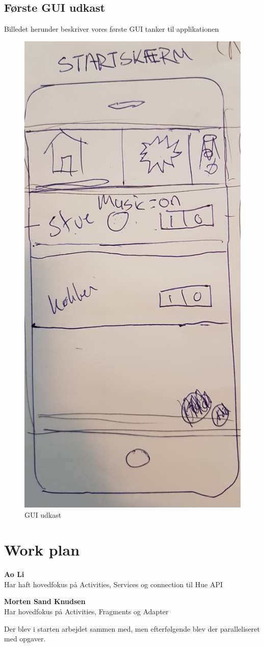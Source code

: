 		\subsection{Første GUI udkast}
		Billedet herunder beskriver vores første GUI tanker til applikationen
		\begin{figure}[H]
			\centering
			\includegraphics[width=0.6\linewidth, height=1\linewidth]{Kravspecifikation/GUI}
			\caption{GUI udkast}
			\label{fig:GUI udkast}
		\end{figure}
		\newpage
		
		\section{Work plan}
		\textbf{Ao Li} \\
		Har haft hovedfokus på Activities, Services og connection til Hue API
		
		\textbf{Morten Sand Knudsen} \\
		Har hovedfokus på Activities, Fragments og Adapter 
		
		Der blev i starten arbejdet sammen med, men efterfølgende blev der paralleliseret med opgaver. 
		
	